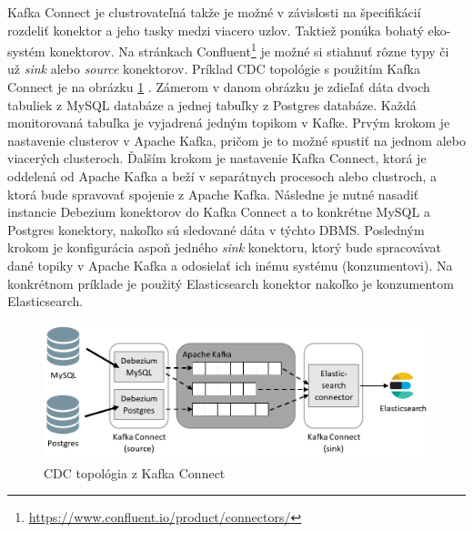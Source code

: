 Kafka Connect je clustrovateľná takže je možné v závislosti na špecifikácií rozdeliť konektor a jeho tasky medzi viacero uzlov. Taktiež ponúka bohatý eko-systém konektorov. Na stránkach Confluent\footnote{\url{https://www.confluent.io/product/connectors/}} je možné si stiahnuť rôzne typy či už \textit{sink} alebo \textit{source} konektorov.
Príklad CDC topológie s použitím Kafka Connect je na obrázku \ref{fig:CDC_topology} \cite{debezium:devoxx}. Zámerom v danom obrázku je zdieľať dáta dvoch tabuliek z MySQL databáze a jednej tabuľky z Postgres databáze. Každá monitorovaná tabuľka je vyjadrená jedným topikom v Kafke. Prvým krokom je nastavenie clusterov v Apache Kafka, pričom je to možné spustiť na jednom alebo viacerých clusteroch. Ďalším krokom je nastavenie Kafka Connect, ktorá je oddelená od Apache Kafka a beží v separátnych procesoch alebo clustroch, a ktorá bude spravovať spojenie z Apache Kafka. Následne je nutné nasadiť instancie Debezium konektorov do Kafka Connect a to konkrétne MySQL a Postgres konektory, nakoľko sú sledované dáta v týchto DBMS. Posledným krokom je konfigurácia aspoň jedného \textit{sink} konektoru, ktorý bude spracovávat dané topiky v Apache Kafka a odosielať ich inému systému (konzumentovi). Na konkrétnom príklade je použitý Elasticsearch konektor nakoľko je konzumentom Elasticsearch.

\begin{figure}[H]
\begin{center}
\includegraphics[width=15cm]{figures/CDC_topology.PNG}
\caption{CDC topológia z Kafka Connect}
\label{fig:CDC_topology}
\end{center}
\end{figure}

